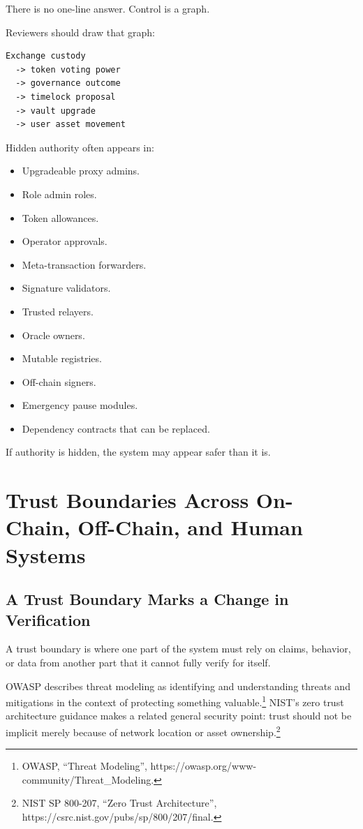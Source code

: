 There is no one-line answer. Control is a graph.

Reviewers should draw that graph:

\begin{lstlisting}
Exchange custody
  -> token voting power
  -> governance outcome
  -> timelock proposal
  -> vault upgrade
  -> user asset movement
\end{lstlisting}

Hidden authority often appears in:

\begin{itemize}
\tightlist
\item
  Upgradeable proxy admins.
\item
  Role admin roles.
\item
  Token allowances.
\item
  Operator approvals.
\item
  Meta-transaction forwarders.
\item
  Signature validators.
\item
  Trusted relayers.
\item
  Oracle owners.
\item
  Mutable registries.
\item
  Off-chain signers.
\item
  Emergency pause modules.
\item
  Dependency contracts that can be replaced.
\end{itemize}

If authority is hidden, the system may appear safer than it is.

\section{Trust Boundaries Across On-Chain, Off-Chain, and Human Systems}

\subsection{A Trust Boundary Marks a Change in Verification}

A trust boundary is where one part of the system must rely on claims,
behavior, or data from another part that it cannot fully verify for
itself.

OWASP describes threat modeling as identifying and understanding threats
and mitigations in the context of protecting something
valuable.\footnote{OWASP, ``Threat Modeling'',
  https://owasp.org/www-community/Threat\_Modeling.} NIST's zero trust
architecture guidance makes a related general security point: trust
should not be implicit merely because of network location or asset
ownership.\footnote{NIST SP 800-207, ``Zero Trust Architecture'',
  https://csrc.nist.gov/pubs/sp/800/207/final.}

